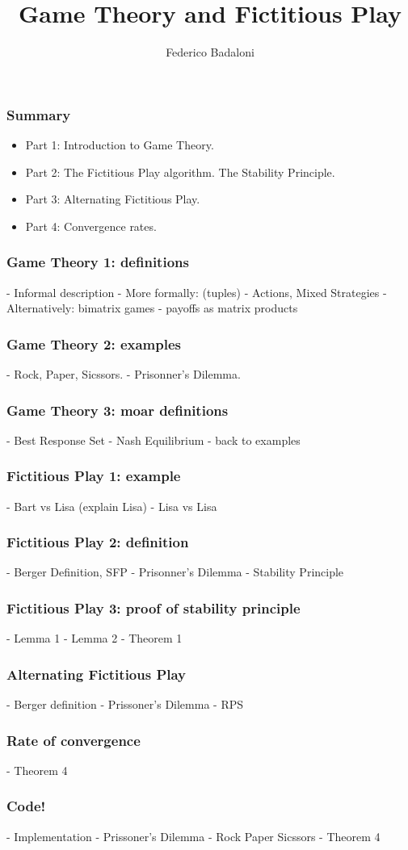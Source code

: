 \documentclass[pdf]{beamer}
\title{Game Theory and Fictitious Play}
\author[]{Federico Badaloni}
\begin{document}
\begin{frame}
\frametitle{Summary}

    \begin{itemize}
    \item Part 1: Introduction to Game Theory.
    \item Part 2: The Fictitious Play algorithm. The Stability Principle.
    \item Part 3: Alternating Fictitious Play.
    \item Part 4: Convergence rates.
    \end{itemize}

\end{frame}

\begin{frame}
    \frametitle{Game Theory 1: definitions}
    - Informal description
    - More formally: (tuples)
    - Actions, Mixed Strategies
    - Alternatively: bimatrix games
    - payoffs as matrix products
\end{frame}

\begin{frame}
    \frametitle{Game Theory 2: examples}
    - Rock, Paper, Sicssors.
    - Prisonner's Dilemma.
\end{frame}

\begin{frame}
    \frametitle{Game Theory 3: moar definitions}
    - Best Response Set
    - Nash Equilibrium
    - back to examples
\end{frame}

\begin{frame}
    \frametitle{Fictitious Play 1: example}
    - Bart vs Lisa (explain Lisa)
    - Lisa vs Lisa
\end{frame}

\begin{frame}
    \frametitle{Fictitious Play 2: definition}
    - Berger Definition, SFP
    - Prisonner's Dilemma
    - Stability Principle
\end{frame}

\begin{frame}
    \frametitle{Fictitious Play 3: proof of stability principle}
    - Lemma 1
    - Lemma 2
    - Theorem 1
\end{frame}

\begin{frame}
    \frametitle{Alternating Fictitious Play}
    - Berger definition
    - Prissoner's Dilemma
    - RPS
\end{frame}

\begin{frame}
    \frametitle{Rate of convergence}
    - Theorem 4
\end{frame}

\begin{frame}
    \frametitle{Code!}
    - Implementation
    - Prissoner's Dilemma
    - Rock Paper Sicssors
    - Theorem 4
\end{frame}
\end{document}
